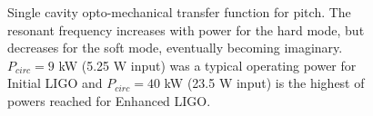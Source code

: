 \begin{figure}
\begin{centering}
\caption[Single cavity opto-mechanical transfer function]{Single
  cavity opto-mechanical transfer function for pitch. The resonant
  frequency increases with power for the hard mode, but decreases for
  the soft mode, eventually becoming imaginary. $P_{circ} = 9$ kW
  (5.25 W input) was a typical operating power for Initial LIGO and
  $P_{circ} = 40$ kW (23.5 W input) is the highest of powers reached
  for Enhanced LIGO.}
\label{fig:optomechhardsoft}
\end{centering}
\end{figure}



